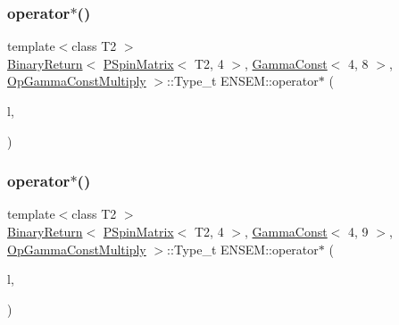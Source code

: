 \subsubsection{\texorpdfstring{operator$\ast$()}{operator*()}\hspace{0.1cm}{\footnotesize\ttfamily [25/64]}}
{\footnotesize\ttfamily template$<$class T2 $>$ \\
\mbox{\hyperlink{structENSEM_1_1BinaryReturn}{Binary\+Return}}$<$ \mbox{\hyperlink{classENSEM_1_1PSpinMatrix}{P\+Spin\+Matrix}}$<$ T2, 4 $>$, \mbox{\hyperlink{classENSEM_1_1GammaConst}{Gamma\+Const}}$<$ 4, 8 $>$, \mbox{\hyperlink{structENSEM_1_1OpGammaConstMultiply}{Op\+Gamma\+Const\+Multiply}} $>$\+::Type\+\_\+t E\+N\+S\+E\+M\+::operator$\ast$ (\begin{DoxyParamCaption}\item[{const \mbox{\hyperlink{classENSEM_1_1PSpinMatrix}{P\+Spin\+Matrix}}$<$ T2, 4 $>$ \&}]{l,  }\item[{const \mbox{\hyperlink{classENSEM_1_1GammaConst}{Gamma\+Const}}$<$ 4, 8 $>$ \&}]{ }\end{DoxyParamCaption})\hspace{0.3cm}{\ttfamily [inline]}}

\mbox{\label{group__primspinmatrix_ga25cb4484aedd17ae7862bb37c00fb7e0}} 
\subsubsection{\texorpdfstring{operator$\ast$()}{operator*()}\hspace{0.1cm}{\footnotesize\ttfamily [26/64]}}
{\footnotesize\ttfamily template$<$class T2 $>$ \\
\mbox{\hyperlink{structENSEM_1_1BinaryReturn}{Binary\+Return}}$<$ \mbox{\hyperlink{classENSEM_1_1PSpinMatrix}{P\+Spin\+Matrix}}$<$ T2, 4 $>$, \mbox{\hyperlink{classENSEM_1_1GammaConst}{Gamma\+Const}}$<$ 4, 9 $>$, \mbox{\hyperlink{structENSEM_1_1OpGammaConstMultiply}{Op\+Gamma\+Const\+Multiply}} $>$\+::Type\+\_\+t E\+N\+S\+E\+M\+::operator$\ast$ (\begin{DoxyParamCaption}\item[{const \mbox{\hyperlink{classENSEM_1_1PSpinMatrix}{P\+Spin\+Matrix}}$<$ T2, 4 $>$ \&}]{l,  }\item[{const \mbox{\hyperlink{classENSEM_1_1GammaConst}{Gamma\+Const}}$<$ 4, 9 $>$ \&}]{ }\end{DoxyParamCaption})\hspace{0.3cm}{\ttfamily [inline]}}

